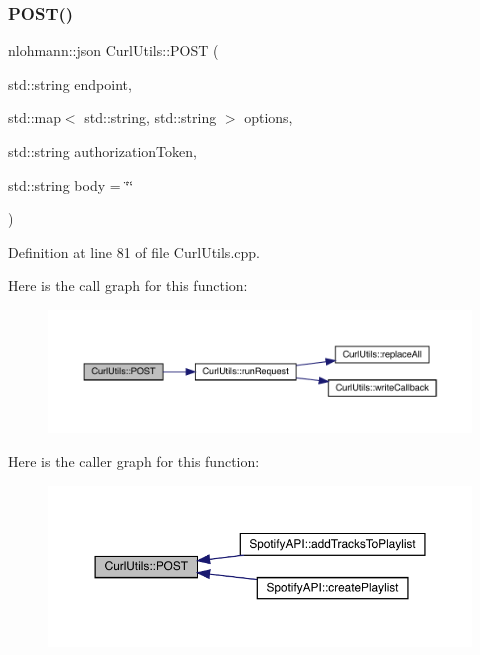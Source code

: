 \subsubsection{\texorpdfstring{P\+O\+S\+T()}{POST()}}
{\footnotesize\ttfamily nlohmann\+::json Curl\+Utils\+::\+P\+O\+ST (\begin{DoxyParamCaption}\item[{std\+::string}]{endpoint,  }\item[{std\+::map$<$ std\+::string, std\+::string $>$}]{options,  }\item[{std\+::string}]{authorization\+Token,  }\item[{std\+::string}]{body = {\ttfamily \char`\"{}\char`\"{}} }\end{DoxyParamCaption})}



Definition at line 81 of file Curl\+Utils.\+cpp.

Here is the call graph for this function\+:
\nopagebreak
\begin{figure}[H]
\begin{center}
\leavevmode
\includegraphics[width=350pt]{class_curl_utils_ad923cee3ef19b5d7944f68ffb50b2fb3_cgraph}
\end{center}
\end{figure}
Here is the caller graph for this function\+:
\nopagebreak
\begin{figure}[H]
\begin{center}
\leavevmode
\includegraphics[width=350pt]{class_curl_utils_ad923cee3ef19b5d7944f68ffb50b2fb3_icgraph}
\end{center}
\end{figure}
\mbox{\label{class_curl_utils_a3b852e68c1c552950944c512712a3620}} 
